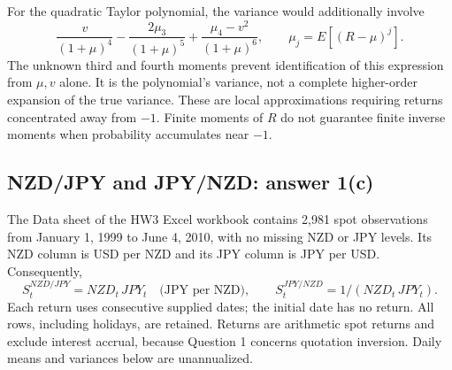 \documentclass[11pt,letterpaper]{article}
\begin{document}
For the quadratic Taylor polynomial, the variance would additionally involve
\begin{equation}
\frac{v}{(1+\mu)^4}-\frac{2\mu_3}{(1+\mu)^5}
+\frac{\mu_4-v^2}{(1+\mu)^6},\qquad
\mu_j=E[(R-\mu)^j].
\end{equation}
The unknown third and fourth moments prevent identification of this expression
from $\mu,v$ alone. It is the polynomial's variance, not a complete higher-order
expansion of the true variance. These are local approximations requiring returns
concentrated away from $-1$. Finite moments of $R$ do not guarantee finite inverse
moments when probability accumulates near $-1$.
\clearpage
\subsection{NZD/JPY and JPY/NZD: answer 1(c)}
The Data sheet of the HW3 Excel workbook contains 2,981 spot observations from
January 1, 1999 to June 4, 2010, with no missing NZD or JPY levels. Its NZD column
is USD per NZD and its JPY column is JPY per USD. Consequently,
\[
S_t^{NZD/JPY}=NZD_t\,JPY_t\quad\text{(JPY per NZD)},\qquad
S_t^{JPY/NZD}=1/(NZD_t\,JPY_t).
\]
Each return uses consecutive supplied dates; the initial date has no return.
All rows, including holidays, are retained. Returns are arithmetic spot returns
and exclude interest accrual, because Question 1 concerns quotation inversion.
Daily means and variances below are unannualized.
\end{document}
